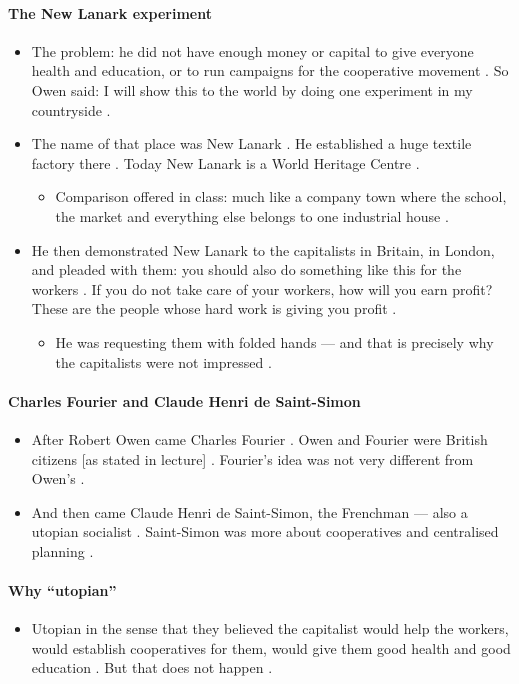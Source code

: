 \paragraph{The New Lanark experiment}
\begin{itemize}
    \item The problem: he did not have enough money or capital to give everyone health and education, or to run campaigns for the cooperative movement . So Owen said: I will show this to the world by doing one experiment in my countryside .
    \item The name of that place was New Lanark . He established a huge textile factory there . Today New Lanark is a World Heritage Centre .
    \begin{itemize}
        \item Comparison offered in class: much like a company town where the school, the market and everything else belongs to one industrial house .
    \end{itemize}
    \item He then demonstrated New Lanark to the capitalists in Britain, in London, and pleaded with them: you should also do something like this for the workers . If you do not take care of your workers, how will you earn profit? These are the people whose hard work is giving you profit .
    \begin{itemize}
        \item He was requesting them with folded hands --- and that is precisely why the capitalists were not impressed .
    \end{itemize}
\end{itemize}

\paragraph{Charles Fourier and Claude Henri de Saint-Simon}
\begin{itemize}
    \item After Robert Owen came Charles Fourier . Owen and Fourier were British citizens [as stated in lecture] . Fourier's idea was not very different from Owen's .
    \item And then came Claude Henri de Saint-Simon, the Frenchman --- also a utopian socialist . Saint-Simon was more about cooperatives and centralised planning .
\end{itemize}

\paragraph{Why ``utopian''}
\begin{itemize}
    \item Utopian in the sense that they believed the capitalist would help the workers, would establish cooperatives for them, would give them good health and good education . But that does not happen .
\end{itemize}

